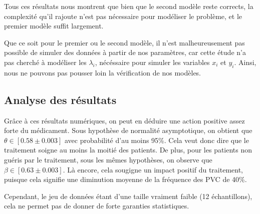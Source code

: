 Tous ces résultats nous montrent que bien que le second modèle reste corrects, la complexité qu'il rajoute n'est pas nécessaire pour modéliser le problème, et le premier modèle suffit largement.

Que ce soit pour le premier ou le second modèle, il n'est malheureusement pas possible de simuler des données à partir de nos paramètres, car cette étude n'a pas cherché à modéliser les $\lambda_i$, nécéssaire pour simuler les variables $x_i$ et $y_i$. Ainsi, nous ne pouvons pas pousser loin la vérification de nos modèles.

\subsection{Analyse des résultats}

Grâce à ces résultats numériques, on peut en déduire une action positive assez forte du médicament. Sous hypothèse de normalité asymptotique, on obtient que $\theta \in [0.58 \pm 0.003]$ avec probabilité d'au moins 95\%. Cela veut donc dire que le traitement soigne au moins la moitié des patients. De plus, pour les patients non guéris par le traitement, sous les mêmes hypothèses, on observe que $\beta \in [0.63 \pm 0.003]$. Là encore, cela sougigne un impact positif du traitement, puisque cela signifie une diminution moyenne de la fréquence des PVC de 40\%. 

Cependant, le jeu de données étant d'une taille vraiment faible (12 échantillons), cela ne permet pas de donner de forte garanties statistiques.